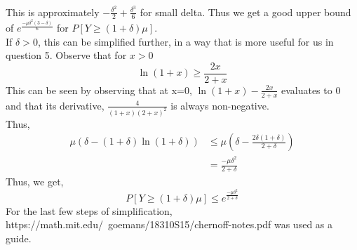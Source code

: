 \begin{enumerate}
\begin{align*}
    \end{align*}
    This is approximately $-\frac{\delta^2}{2} + \frac{\delta^3}{6}$ for small delta. Thus we get a good upper bound of $e^{\frac{-\mu\delta^2(3-\delta)}{6}}$ for $P[Y\ge (1+\delta)\mu]$.\\
    If $\delta > 0$, this can be simplified further, in a way that is more useful for us in question 5. Observe that for $x > 0$
    \[
        \ln(1+x) \ge \frac{2x}{2+x}
    \]
    This can be seen by observing that at x=0, $\ln(1+x)-\frac{2x}{2+x}$ evaluates to 0 and that its derivative, $\frac{4}{(1+x)(2+x)^2}$ is always non-negative.\\
    Thus, 
    \begin{align*}
        \mu (\delta - (1+\delta)\ln(1+\delta)) &\le \mu (\delta - \frac{2\delta(1+\delta)}{2+\delta})\\
        &= \frac{-\mu\delta^2}{2+\delta}
    \end{align*}
    Thus, we get,
    \begin{equation}
        \label{eq:2}
        P[Y\ge (1+\delta)\mu] \le e^{\frac{-\mu\delta^2}{2+\delta}}
    \end{equation}
    For the last few steps of simplification, https://math.mit.edu/~goemans/18310S15/chernoff-notes.pdf was used as a guide.
\end{enumerate}
